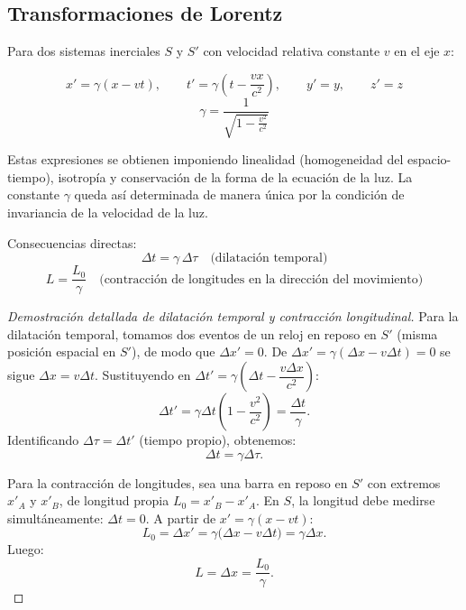 \documentclass[12pt, a4paper]{article}
\theoremstyle{plain}
\theoremstyle{definition}
\theoremstyle{remark}
\begin{document}
\subsection{Transformaciones de Lorentz}

Para dos sistemas inerciales $S$ y $S'$ con velocidad relativa constante $v$ en el eje $x$:
\begin{mdframed}[style=resultado]
\begin{equation}
  x'=\gamma(x-vt),\qquad
  t'=\gamma\left(t-\frac{vx}{c^2}\right),\qquad
  y'=y,\qquad z'=z
\end{equation}
\begin{equation}
  \gamma=\frac{1}{\sqrt{1-\frac{v^2}{c^2}}}
\end{equation}
\end{mdframed}
Estas expresiones se obtienen imponiendo linealidad (homogeneidad del espacio-tiempo),
isotropía y conservación de la forma de la ecuación de la luz.
La constante $\gamma$ queda así determinada de manera única por la condición de invariancia
de la velocidad de la luz.

Consecuencias directas:
\begin{equation}
  \Delta t = \gamma\,\Delta\tau
  \quad\text{(dilatación temporal)}
\end{equation}
\begin{equation}
  L = \frac{L_0}{\gamma}
  \quad\text{(contracción de longitudes en la dirección del movimiento)}
\end{equation}

\begin{proof}[Demostración detallada de dilatación temporal y contracción longitudinal]
Para la dilatación temporal, tomamos dos eventos de un reloj en reposo en $S'$ (misma
posición espacial en $S'$), de modo que $\Delta x'=0$. De
$\Delta x'=\gamma(\Delta x-v\Delta t)=0$ se sigue $\Delta x=v\Delta t$.
Sustituyendo en
$\Delta t'=\gamma\!\left(\Delta t-\dfrac{v\Delta x}{c^2}\right)$:
\begin{equation}
  \Delta t'=\gamma\Delta t\!\left(1-\frac{v^2}{c^2}\right)=\frac{\Delta t}{\gamma}.
\end{equation}
Identificando $\Delta\tau=\Delta t'$ (tiempo propio), obtenemos:
\begin{equation}
  \Delta t=\gamma\Delta\tau.
\end{equation}

Para la contracción de longitudes, sea una barra en reposo en $S'$ con extremos
$x'_A$ y $x'_B$, de longitud propia $L_0=x'_B-x'_A$. En $S$, la longitud debe medirse
simultáneamente: $\Delta t=0$. A partir de
$x'=\gamma(x-vt)$:
\begin{equation}
  L_0=\Delta x'=\gamma\bigl(\Delta x-v\Delta t\bigr)=\gamma\Delta x.
\end{equation}
Luego:
\begin{equation}
  L=\Delta x=\frac{L_0}{\gamma}.
\end{equation}
\end{proof}
\end{document}
